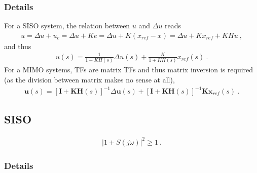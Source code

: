 \documentclass[letterpaper,10pt,english]{jupyterBook}
\begin{document}
\subsubsection*{Details}

\sphinxAtStartPar
For a SISO system, the relation between \(u\) and \(\Delta u\) reads
\begin{equation*}
\begin{split}u = \Delta u + u_c = \Delta u + K e = \Delta u + K (x_{ref} - x) = \Delta u + K x_{ref} + K H u \ ,\end{split}
\end{equation*}
\sphinxAtStartPar
and thus
\begin{equation*}
\begin{split}u(s) = \frac{1}{1+K H(s)} \Delta u(s) + \frac{K}{1 + K H(s)} x_{ref}(s) \ .\end{split}
\end{equation*}
\sphinxAtStartPar
For a MIMO systems, TFs are matrix TFs and thus matrix inversion is required (as the division between matrix makes no sense at all),
\begin{equation*}
\begin{split}\mathbf{u}(s) = \left[ \mathbf{I} + \mathbf{K} \mathbf{H}(s) \right]^{-1} \Delta\mathbf{u}(s) + \left[ \mathbf{I} + \mathbf{K} \mathbf{H}(s) \right]^{-1} \mathbf{K} \mathbf{x}_{ref}(s) \ .\end{split}
\end{equation*}

\subsection{SISO}
\label{\detokenize{ch/control/optimal-control-margins:siso}}\label{\detokenize{ch/control/optimal-control-margins:control-optimal-margins-siso}}\begin{equation*}
\begin{split}\left| 1 + S(j\omega) \right|^2 \ge 1 \ .\end{split}
\end{equation*}\subsubsection*{Details}
\end{document}
